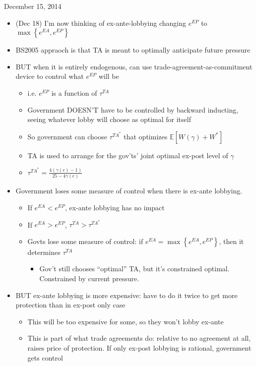 \documentclass[12pt]{article}
\newcommand{\expect}{\mathbb{E}}
\newcommand{\ga}{\gamma}
\begin{document}
\newpage
December 15, 2014
\begin{itemize}
	\item (Dec 18) I'm now thinking of ex-ante-lobbying changing $e^{EP}$ to $\max \left\{e^{EA}, e^{EP}\right\}$
	\item BS2005 appraoch is that TA is meant to optimally anticipate future pressure
	\item BUT when it is entirely endogenous, can use trade-agreement-as-commitment device to control what $e^{EP}$ will be
		\begin{itemize}
			\item i.e. $e^{EP}$ is a function of $\tau^{TA}$
			\item Government DOESN'T have to be controlled by backward inducting, seeing whatever lobby will choose as optimal for itself
			\item So government can choose $\tau^{TA^*}$ that optimizes $\expect \left[W(\ga) + W^* \right]$
			\item TA is used to arrange for the gov'ts' joint optimal ex-post level of $\ga$
			\item $\tau^{TA^*} = \frac{4\left(\ga(e)-1\right)}{25-4\ga(e)}$
		\end{itemize}
	\item Government loses some measure of control when there is ex-ante lobbying.
		\begin{itemize}
			\item If $e^{EA} < e^{EP}$, ex-ante lobbying has no impact
			\item If $e^{EA} > e^{EP}$, $\tau^{TA} >\tau^{TA^*}$
			\item Govts lose some measure of control: if $e^{EA} = \max \left\{e^{EA}, e^{EP}\right\}$, then it determines $\tau^{TA}$
				\begin{itemize}
					\item Gov't still chooses ``optimal'' TA, but it's constrained optimal. Constrained by current pressure.
				\end{itemize}
		\end{itemize}
	\item BUT ex-ante lobbying is more expensive: have to do it twice to get more protection than in ex-post only case
		\begin{itemize}
			\item This will be too expensive for some, so they won't lobby ex-ante
			\item This is part of what trade agreements do: relative to no agreement at all, raises price of protection. If only ex-post lobbying is rational, government gets control

\end{itemize}
\end{itemize}
\end{document}
